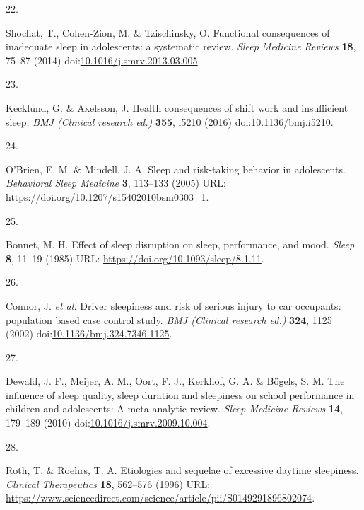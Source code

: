\documentclass[
  10pt,
]{scrbook}
\newlength{\cslhangindent}
\newlength{\csllabelwidth}
\newlength{\cslentryspacingunit} %
\newenvironment{CSLReferences}[2] %
 {%
  \setlength{\parindent}{0pt}
  \ifodd #1
  \let\oldpar\par
  \def\par{\hangindent=\cslhangindent\oldpar}
  \fi
  \setlength{\parskip}{#2\cslentryspacingunit}
 }%
 {}
\newcommand{\CSLLeftMargin}[1]{\parbox[t]{\csllabelwidth}{#1}}
\newcommand{\CSLRightInline}[1]{\parbox[t]{\linewidth - \csllabelwidth}{#1}\break}
\let\originaltextbf\textbf
\renewcommand{\textbf}[1]{\textcolor{color1}{\originaltextbf{#1}}}
\begin{document}
\begin{CSLReferences}{0}{0}
\leavevmode{}%
\CSLLeftMargin{22. }%
\CSLRightInline{Shochat, T., Cohen-Zion, M. \& Tzischinsky, O.
Functional consequences of inadequate sleep in adolescents: a systematic
review. \emph{Sleep Medicine Reviews} \textbf{18}, 75--87 (2014)
doi:\href{https://doi.org/10.1016/j.smrv.2013.03.005}{10.1016/j.smrv.2013.03.005}.}

\leavevmode{}%
\CSLLeftMargin{23. }%
\CSLRightInline{Kecklund, G. \& Axelsson, J. Health consequences of
shift work and insufficient sleep. \emph{BMJ (Clinical research ed.)}
\textbf{355}, i5210 (2016)
doi:\href{https://doi.org/10.1136/bmj.i5210}{10.1136/bmj.i5210}.}

\leavevmode{}%
\CSLLeftMargin{24. }%
\CSLRightInline{O'Brien, E. M. \& Mindell, J. A. Sleep and risk-taking
behavior in adolescents. \emph{Behavioral Sleep Medicine} \textbf{3},
113--133 (2005) URL: \url{https://doi.org/10.1207/s15402010bsm0303_1}.}

\leavevmode{}%
\CSLLeftMargin{25. }%
\CSLRightInline{Bonnet, M. H. Effect of sleep disruption on sleep,
performance, and mood. \emph{Sleep} \textbf{8}, 11--19 (1985) URL:
\url{https://doi.org/10.1093/sleep/8.1.11}.}

\leavevmode{}%
\CSLLeftMargin{26. }%
\CSLRightInline{Connor, J. \emph{et al.} Driver sleepiness and risk of
serious injury to car occupants: population based case control study.
\emph{BMJ (Clinical research ed.)} \textbf{324}, 1125 (2002)
doi:\href{https://doi.org/10.1136/bmj.324.7346.1125}{10.1136/bmj.324.7346.1125}.}

\leavevmode{}%
\CSLLeftMargin{27. }%
\CSLRightInline{Dewald, J. F., Meijer, A. M., Oort, F. J., Kerkhof, G.
A. \& Bögels, S. M. The influence of sleep quality, sleep duration and
sleepiness on school performance in children and adolescents: A
meta-analytic review. \emph{Sleep Medicine Reviews} \textbf{14},
179--189 (2010)
doi:\href{https://doi.org/10.1016/j.smrv.2009.10.004}{10.1016/j.smrv.2009.10.004}.}

\leavevmode{}%
\CSLLeftMargin{28. }%
\CSLRightInline{Roth, T. \& Roehrs, T. A. Etiologies and sequelae of
excessive daytime sleepiness. \emph{Clinical Therapeutics} \textbf{18},
562--576 (1996) URL:
\url{https://www.sciencedirect.com/science/article/pii/S0149291896802074}.}


\end{CSLReferences}
\end{document}
